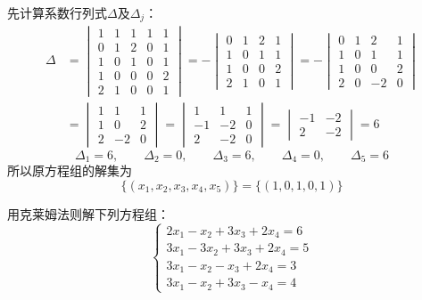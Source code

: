 \begin{solution}
先计算系数行列式$\Delta$及$\Delta_j$： 
\[\begin{split}
   \Delta&=\begin{vmatrix}
  1&1&1&1&1\\
  0&1&2&0&1\\
  1&0&1&0&1\\
  1&0&0&0&2\\
  2&1&0&0&1
   \end{vmatrix}=-\begin{vmatrix}
       0&1&2&1\\
       1&0&1&1\\
       1&0&0&2\\
       2&1&0&1
   \end{vmatrix}=-\begin{vmatrix}
    0&1&2&1\\
    1&0&1&1\\
    1&0&0&2\\
    2&0&-2&0   
   \end{vmatrix}\\
   &=\begin{vmatrix}
       1&1&1\\
       1&0&2\\
       2&-2&0
   \end{vmatrix} =\begin{vmatrix}
       1&1&1\\-1&-2&0\\2&-2&0
   \end{vmatrix}=\begin{vmatrix}
      -1&-2\\2&-2 
   \end{vmatrix}=6
\end{split}\]
\[\Delta_1=6,\qquad \Delta_2=0,\qquad \Delta_3=6,\qquad \Delta_4=0,\qquad \Delta_5=6 \]
所以原方程组的解集为
\[\{(x_1,x_2,x_3,x_4,x_5)\}=\{(1,0,1,0,1)\}\]

\end{solution}


\begin{ex}
    用克莱姆法则解下列方程组：
\[\begin{cases}
    2x_1-x_2+3x_3+2x_4=6\\
    3x_1-3x_2+3x_3+2x_4=5\\
    3x_1-x_2-x_3+2x_4=3\\
    3x_1-x_2+3x_3-x_4=4
\end{cases}  \]
\end{ex}

